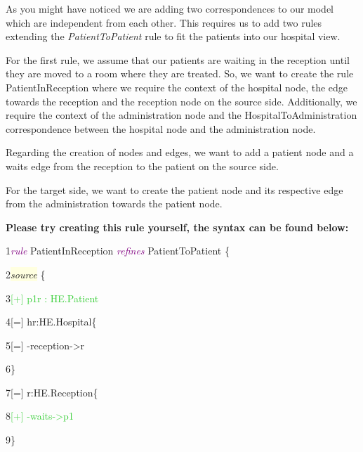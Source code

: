 {As you might have noticed we are adding two correspondences to our model which are independent from each other. This requires us to add two rules extending the \textsf{\textit{PatientToPatient}} rule to fit the patients into our hospital view.

For the first rule, we assume that our patients are waiting in the reception until they are moved to a room where they are treated. So, we want to create the rule \textsf{PatientInReception} where we require the context of the hospital node, the edge towards the reception and the reception node on the source side. Additionally, we require the context of the administration node and the \textsf{HospitalToAdministration} correspondence between the hospital node and the administration node. 

Regarding the creation of nodes and edges, we want to add a patient node and a \textsf{waits} edge from the reception to the patient on the source side.

For the target side, we want to create the patient node and its respective edge from the administration towards the patient node.\newline

\textbf{Please try creating this rule yourself, the syntax can be found below:}\newline

{

1\hspace{0.5cm}\textcolor{Purple}{\textit{rule}} PatientInReception \textcolor{Purple}{\textit{refines}} PatientToPatient \{

2\hspace{0.5cm}\colorbox{LightYellow}{\textit{source}} \{ 

3\hspace{1cm}\textcolor{LimeGreen}{[+] p1r : HE.Patient}

4\hspace{1cm}[=] hr:HE.Hospital\{

5\hspace{1.5cm}[=] -reception->r

6\hspace{1cm}\}

7\hspace{1cm}[=] r:HE.Reception\{

8\hspace{1.5cm}\textcolor{LimeGreen}{[+] -waits->p1}

9\hspace{1cm}\}

}}
